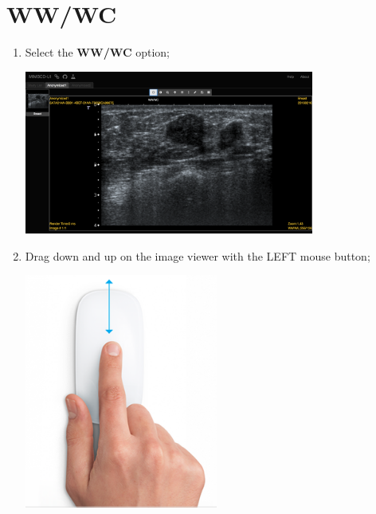 \documentclass{tufte-book} %
\begin{document}
\hfill

\chapter{WW/WC}

\begin{enumerate}

\item Select the \textbf{WW/WC} option;

\hfill

\begin{center}
\includegraphics[width=0.75\textwidth]{graphics/anon1_ww_off.png}
\end{center}

\hfill

\clearpage

\item Drag down and up on the image viewer with the LEFT mouse button;

\hfill

\begin{center}
\includegraphics[width=0.50\textwidth]{graphics/mouse-up-down.png}
\end{center}


\end{enumerate}
\end{document}
